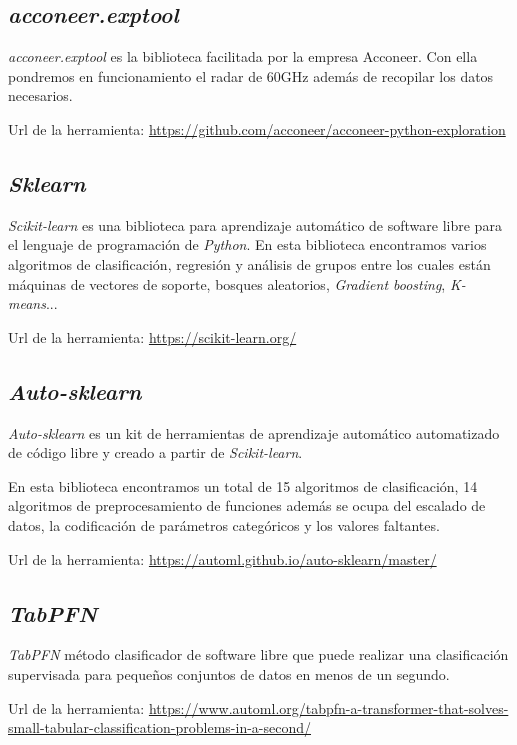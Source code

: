 \subsection{\textit{acconeer.exptool}}

\textit{acconeer.exptool} es la biblioteca facilitada por la empresa Acconeer. Con ella pondremos en funcionamiento el radar de 60GHz además de recopilar los datos necesarios.

Url de la herramienta: \url{https://github.com/acconeer/acconeer-python-exploration}


\subsection{\textit{Sklearn}}

\textit{Scikit-learn} es una biblioteca para aprendizaje automático de software libre para el lenguaje de programación de \textit{Python}.
En esta biblioteca encontramos varios algoritmos de clasificación, regresión y análisis de grupos entre los cuales están máquinas de vectores de soporte, bosques aleatorios, \textit{Gradient boosting}, \textit{K-means}...

Url de la herramienta: \url{https://scikit-learn.org/}

\subsection{\textit{Auto-sklearn}}

\textit{Auto-sklearn} es un kit de herramientas de aprendizaje automático automatizado de código libre y creado a partir de \textit{Scikit-learn}.

En esta biblioteca encontramos un total de 15 algoritmos de clasificación, 14 algoritmos de preprocesamiento de funciones además se ocupa del escalado de datos, la codificación de parámetros categóricos y los valores faltantes.

Url de la herramienta: \url{https://automl.github.io/auto-sklearn/master/}

\subsection{\textit{TabPFN}}

\textit{TabPFN} método clasificador de software libre que puede realizar una clasificación supervisada para pequeños conjuntos de datos en menos de un segundo.

Url de la herramienta: \url{https://www.automl.org/tabpfn-a-transformer-that-solves-small-tabular-classification-problems-in-a-second/}

